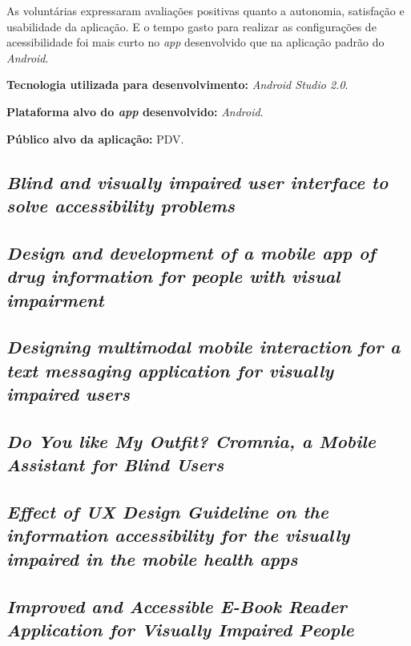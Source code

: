 As voluntárias expressaram avaliações positivas quanto a autonomia, satisfação e usabilidade da aplicação. E o tempo gasto para realizar as configurações de acessibilidade foi mais curto no \emph{app} desenvolvido que na aplicação padrão do \emph{Android}.

\textbf{Tecnologia utilizada para desenvolvimento:} \emph{Android Studio 2.0}.

\textbf{Plataforma alvo do \emph{app} desenvolvido:} \emph{Android}.

\textbf{Público alvo da aplicação:} PDV.

\subsection{\emph{Blind and visually impaired user interface to solve accessibility problems}}

\lipsum[31]

\subsection{\emph{Design and development of a mobile app of drug information for people with visual impairment}}

\lipsum[31]

\subsection{\emph{Designing multimodal mobile interaction for a text messaging application for visually impaired users}}

\lipsum[31]

\subsection{\emph{Do You like My Outfit? Cromnia, a Mobile Assistant for Blind Users}}

\lipsum[31]

\subsection{\emph{Effect of UX Design Guideline on the information accessibility for the visually impaired in the mobile health apps}}

\lipsum[31]

\subsection{\emph{Improved and Accessible E-Book Reader Application for Visually Impaired People}}

